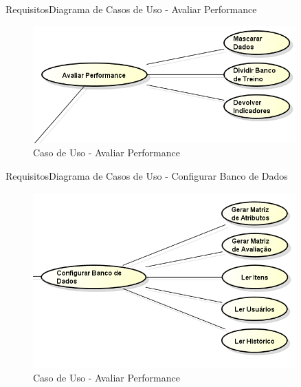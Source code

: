 \begin{frame}{Requisitos}{Diagrama de Casos de Uso - Avaliar Performance}

\begin{figure}[ht]
    \begin{center}
    \includegraphics[width=0.9\textwidth]{img/CasosDeUso_Avaliar_Performance}
    \end{center}
\caption{Caso de Uso - Avaliar Performance}
\end{figure}
\end{frame}

\begin{frame}{Requisitos}{Diagrama de Casos de Uso - Configurar Banco de Dados}

\begin{figure}[ht]
    \begin{center}
    \includegraphics[width=0.9\textwidth]{img/CasosDeUso_Configurar_banco}
    \end{center}
\caption{Caso de Uso - Avaliar Performance}
\end{figure}
\end{frame}


